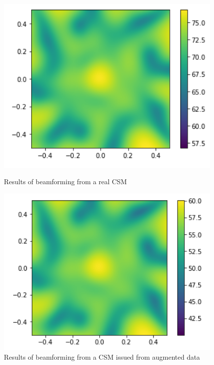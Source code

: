 \documentclass{article}
\begin{document}
\begin{figure}
    \centering
    \begin{minipage}{0.45\textwidth}
        \includegraphics[width=1.2\textwidth]{../figs/beamforming_real_csm.png}
        \caption{Results of beamforming from a real CSM}
        \label{fig:beamforming_real_csm}
    \end{minipage}\hfill
    \begin{minipage}{0.45\textwidth}
        \includegraphics[width=1.2\textwidth]{../figs/beamforming_augmented_csm.png}
        \caption{Results of beamforming from a CSM issued from augmented data}
        \label{fig:beamforming_augmented_csm}
    \end{minipage}
\end{figure}
\end{document}
